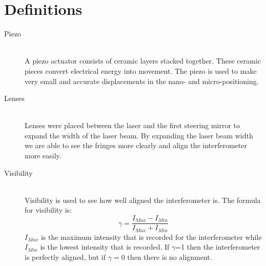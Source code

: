 \onecolumn
\section{Definitions}

\begin{description}
  \item[Piezo] \hfill \\ 
  A piezo actuator consists of ceramic layers stacked together. These ceramic pieces convert electrical energy into movement. The piezo is used to make very small and accurate displacements in the nano- and micro-positioning.
  \item[Lenses] \hfill \\ 
  Lenses were placed between the laser and the first steering mirror to expand the width of the laser beam. By expanding the laser beam width we are able to see the fringes more clearly and align the interferometer more easily.
  \item[Visibility] \hfill \\
  Visibility is used to see how well aligned the interferometer is. The formula for visibility is:
%
     \begin{equation}\label{eqn:Visibility}  
        \gamma= \frac{I_{Max} - I_{Min}}{I_{Max} + I_{Min}}
     \end{equation}    
%
$I_{Max}$ is the maximum intensity that is recorded for the interferometer while $I_{Min}$ is the lowest intensity that is recorded.  If $\gamma$=1 then the interferometer is perfectly aligned, but if $\gamma=0$ then there is no alignment. 
\end{description}

